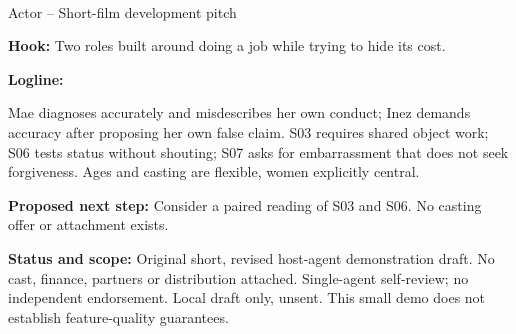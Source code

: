 \documentclass[11pt,letterpaper]{article}
\begin{document}
\begin{center}
{\Large\bfseries\sffamily \filmtitleupper}\\[6pt]
Actor -- Short-film development pitch
\end{center}
\textbf{Hook:} Two roles built around doing a job while trying to hide its cost.

\textbf{Logline:} \filmlogline

Mae diagnoses accurately and misdescribes her own conduct; Inez demands accuracy after proposing her own false claim. S03 requires shared object work; S06 tests status without shouting; S07 asks for embarrassment that does not seek forgiveness. Ages and casting are flexible, women explicitly central.

\textbf{Proposed next step:} Consider a paired reading of S03 and S06. No casting offer or attachment exists.

\textbf{Status and scope:} Original short, revised host-agent demonstration draft. No cast, finance, partners or distribution attached. Single-agent self-review; no independent endorsement. Local draft only, unsent. This small demo does not establish feature-quality guarantees.
\end{document}
